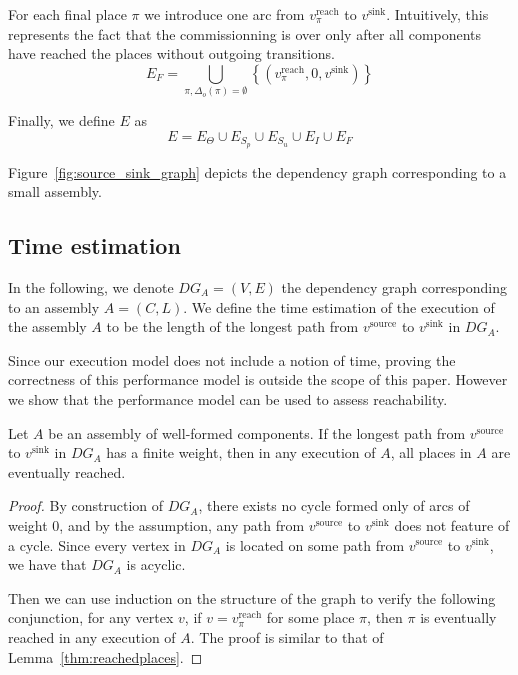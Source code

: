 For each final place $\pi$ we introduce one arc from $v_\pi^\text{reach}$
to $v^\text{sink}$. Intuitively, this represents the fact that the
commissionning is over only after all components have reached the
places without outgoing transitions.
\[
E_F=\bigcup_{\pi, \Delta_o(\pi) = \emptyset}\left\{ \left(v_\pi^\text{reach},0,v^\text{sink}\right)\right\} 
\]

Finally, we define $E$ as 
\[
E= E_{\Theta} \cup E_{S_p}\cup E_{S_u}\cup E_{I}\cup E_{F}
\]

Figure~\ref{fig:source_sink_graph} depicts the dependency graph
corresponding to a small assembly.


\subsection{Time estimation}

In the following, we denote $DG_A=(V,E)$ the dependency graph
corresponding to an assembly $A=(C,L)$. We define the time estimation
of the execution of the \mad assembly $A$ to be the length of the
longest path from $v^\text{source}$ to $v^\text{sink}$ in $DG_A$.

Since our execution model does not include a notion of time, proving
the correctness of this performance model is outside the scope of this
paper. However we show that the performance model can be used to
assess reachability.

\begin{lemma}
  Let $A$ be an assembly of well-formed components. If the longest
  path from $v^\text{source}$ to $v^\text{sink}$ in $DG_A$ has a
  finite weight, then in any execution of $A$, all places in $A$ are
  eventually reached.
\end{lemma}

\begin{proof}
  By construction of $DG_A$, there exists no cycle formed only of arcs
  of weight 0, and by the assumption, any path from $v^\text{source}$
  to $v^\text{sink}$ does not feature of a cycle. Since every vertex
  in $DG_A$ is located on some path from $v^\text{source}$ to
  $v^\text{sink}$, we have that $DG_A$ is acyclic.

  Then we can use induction on the structure of the graph to verify
  the following conjunction, for any vertex $v$, if $v =
  v^\text{reach}_\pi$ for some place $\pi$, then $\pi$ is eventually
  reached in any execution of $A$. The proof is similar to that of
  Lemma~\ref{thm:reachedplaces}.
\end{proof}


